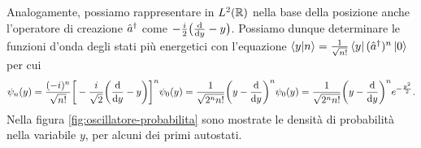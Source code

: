 Analogamente, possiamo rappresentare in $L^2(\mathbb{R})$ nella base della posizione anche l'operatore di creazione ${\hat{a}}^\dagger$ come $-\frac{i}2\big(\frac{\textup{d} {}}{\textup{d} {y}}-y\big)$.
Possiamo dunque determinare le funzioni d'onda degli stati più energetici con l'equazione $\left\langle{y}\middle|{n}\right\rangle=\frac1{\sqrt{n!}}\left\langle{y}\right|({\hat{a}}^\dagger)^n\left|{0}\right\rangle$ per cui
\begin{equation}
	\psi_n(y)=\frac{(-i)^n}{\sqrt{n!}}\bigg[-\frac{i}{\sqrt{2}}\bigg(\frac{\textup{d} {}}{\textup{d} {y}}-y\bigg)\bigg]^n\psi_0(y)=\frac1{\sqrt{2^nn!}}\bigg(y-\frac{\textup{d} {}}{\textup{d} {y}}\bigg)^n\psi_0(y)=\frac1{\sqrt{2^nn!}}\bigg(y-\frac{\textup{d} {}}{\textup{d} {y}}\bigg)^ne^{-\frac{y^2}2}.
\end{equation}
Nella figura \ref{fig:oscillatore-probabilita} sono mostrate le densità di probabilità nella variabile $y$, per alcuni dei primi autostati.


